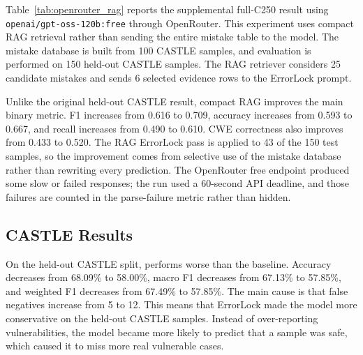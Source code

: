 Table~\ref{tab:openrouter_rag} reports the supplemental full-C250 result using \texttt{openai/gpt-oss-120b:free} through OpenRouter. This experiment uses compact RAG retrieval rather than sending the entire mistake table to the model. The mistake database is built from 100 CASTLE samples, and evaluation is performed on 150 held-out CASTLE samples. The RAG retriever considers 25 candidate mistakes and sends 6 selected evidence rows to the ErrorLock prompt.

\begin{table}[t]
\centering
\small
\caption{Supplemental full-C250 OpenRouter compact-RAG result. Both rows use the same 150 held-out CASTLE test samples.}
\label{tab:openrouter_rag}
\end{table}

Unlike the original held-out CASTLE result, compact RAG improves the main binary metric. F1 increases from 0.616 to 0.709, accuracy increases from 0.593 to 0.667, and recall increases from 0.490 to 0.610. CWE correctness also improves from 0.433 to 0.520. The RAG ErrorLock pass is applied to 43 of the 150 test samples, so the improvement comes from selective use of the mistake database rather than rewriting every prediction. The OpenRouter free endpoint produced some slow or failed responses; the run used a 60-second API deadline, and those failures are counted in the parse-failure metric rather than hidden.

\subsection{CASTLE Results}

On the held-out CASTLE split, \system performs worse than the baseline. Accuracy decreases from 68.09\% to 58.00\%, macro F1 decreases from 67.13\% to 57.85\%, and weighted F1 decreases from 67.49\% to 57.85\%. The main cause is that false negatives increase from 5 to 12. This means that ErrorLock made the model more conservative on the held-out CASTLE samples. Instead of over-reporting vulnerabilities, the model became more likely to predict that a sample was safe, which caused it to miss more real vulnerable cases.

